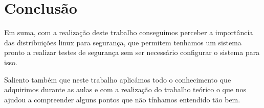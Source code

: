 \documentclass[11pt]{article}
\begin{document}
\section{Conclusão}

\hspace{0.5cm}Em suma, com a realização deste trabalho conseguimos  perceber a importância das distribuições linux para segurança, que permitem tenhamos um sistema pronto a realizar testes de segurança sem ser necessário configurar o sistema para isso.

Saliento também que neste trabalho aplicámos todo o conhecimento que adquirimos durante as aulas e com a realização do trabalho teórico o que nos ajudou a compreender alguns pontos que não tínhamos entendido tão bem.
\end{document}
